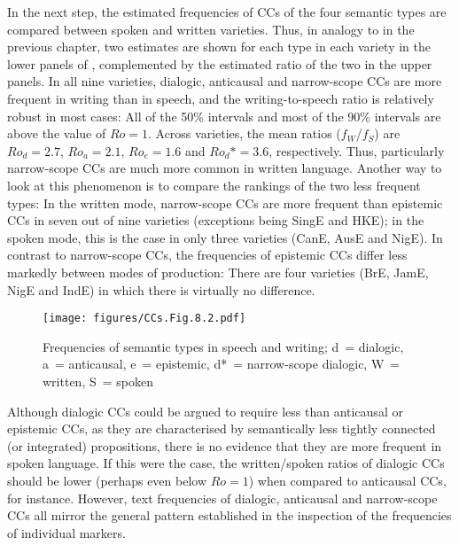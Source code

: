 In the next step, the estimated frequencies of CCs of the four semantic types are compared between spoken and written varieties. Thus, in analogy to  in the previous chapter, two estimates are shown for each type in each variety in the lower panels of , complemented by the estimated ratio of the two in the upper panels. In all nine varieties, dialogic, anticausal and narrow-scope CCs are more frequent in writing than in speech, and the writing-to-speech ratio is relatively robust in most cases: All of the 50\% intervals and most of the 90\% intervals are above the value of $Ro=1$. Across varieties, the mean ratios ($f_W$/$f_S$) are $Ro_d=2.7$, $Ro_a=2.1$, $Ro_e=1.6$ and $Ro_d*=3.6$, respectively. Thus, particularly narrow-scope CCs are much more common in written language. Another way to look at this phenomenon is to compare the rankings of the two less frequent types: In the written mode, narrow-scope CCs are more frequent than epistemic CCs in seven out of nine varieties (exceptions being SingE and HKE); in the spoken mode, this is the case in only three varieties (CanE, AusE and NigE). In contrast to narrow-scope CCs, the frequencies of epistemic CCs differ less markedly between modes of production: There are four varieties (BrE, JamE, NigE and IndE) in which there is virtually no difference.

\begin{figure}
\texttt{[image: figures/CCs.Fig.8.2.pdf]}
\caption{\label{bkm:Ref52893515}\label{fig:8.2}Frequencies of semantic types in speech and writing; d~= dialogic, a~= anticausal, e~= epistemic, d*~= narrow-scope dialogic, W~= written, S~= spoken}
\end{figure}

Although dialogic CCs could be argued to require less  than anticausal or epistemic CCs, as they are characterised by semantically less tightly connected (or integrated) propositions, there is no evidence that they are more frequent in spoken language. If this were the case, the written/spoken ratios of dialogic CCs should be lower (perhaps even below $Ro=1$) when compared to anticausal CCs, for instance. However, text frequencies of dialogic, anticausal and narrow-scope CCs all mirror the general pattern established in the inspection of the frequencies of individual markers.

